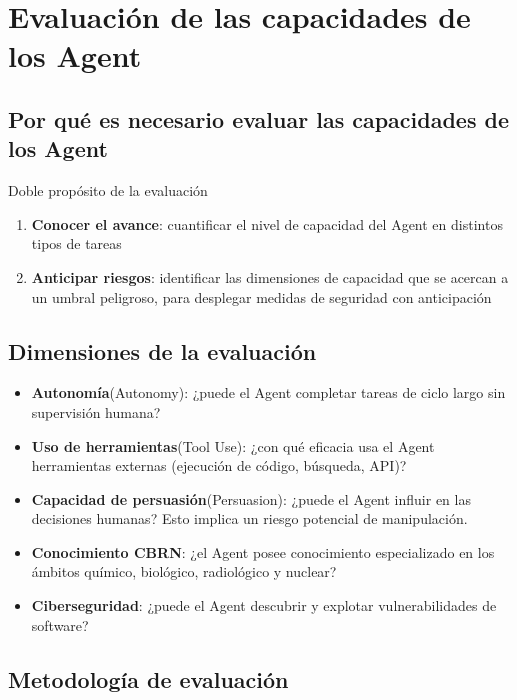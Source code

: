 \section{Evaluación de las capacidades de los Agent}

\subsection{Por qué es necesario evaluar las capacidades de los Agent}

\begin{importantbox}{Doble propósito de la evaluación}
\begin{enumerate}
    \item \textbf{Conocer el avance}: cuantificar el nivel de capacidad del Agent en distintos tipos de tareas
    \item \textbf{Anticipar riesgos}: identificar las dimensiones de capacidad que se acercan a un umbral peligroso, para desplegar medidas de seguridad con anticipación
\end{enumerate}
\end{importantbox}

\subsection{Dimensiones de la evaluación}

\begin{itemize}
    \item \textbf{Autonomía}(Autonomy): ¿puede el Agent completar tareas de ciclo largo sin supervisión humana?
    \item \textbf{Uso de herramientas}(Tool Use): ¿con qué eficacia usa el Agent herramientas externas (ejecución de código, búsqueda, API)?
    \item \textbf{Capacidad de persuasión}(Persuasion): ¿puede el Agent influir en las decisiones humanas? Esto implica un riesgo potencial de manipulación.
    \item \textbf{Conocimiento CBRN}: ¿el Agent posee conocimiento especializado en los ámbitos químico, biológico, radiológico y nuclear?
    \item \textbf{Ciberseguridad}: ¿puede el Agent descubrir y explotar vulnerabilidades de software?
\end{itemize}

\subsection{Metodología de evaluación}


